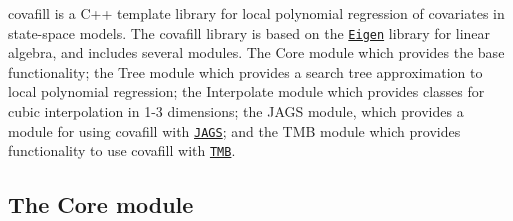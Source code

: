 covafill is a C++ template library for local polynomial regression of covariates in state-\/space models. The covafill library is based on the \href{http://http://eigen.tuxfamily.org}{\tt Eigen} library for linear algebra, and includes several modules. The Core module which provides the base functionality; the Tree module which provides a search tree approximation to local polynomial regression; the Interpolate module which provides classes for cubic interpolation in 1-\/3 dimensions; the J\+A\+G\+S module, which provides a module for using covafill with \href{http://http://mcmc-jags.sourceforge.net/}{\tt J\+A\+G\+S}; and the T\+M\+B module which provides functionality to use covafill with \href{http://tmb-project.org}{\tt T\+M\+B}.

\subsection*{The Core module}